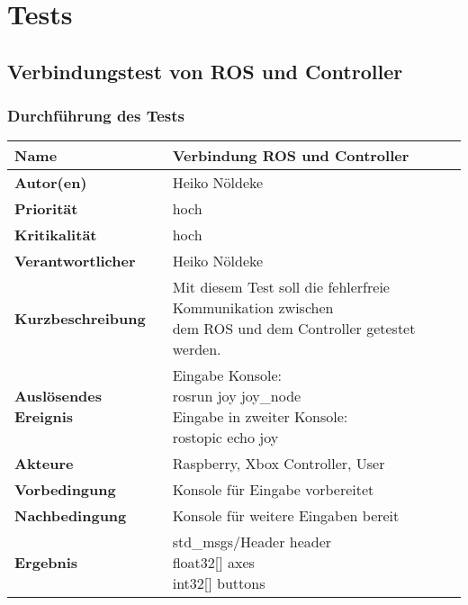 \section{Tests}
\label{sec:tests}

\subsection{Verbindungstest von ROS und Controller}
\subsubsection{Durchführung des Tests}
\begin{tabularx}{\columnwidth}{|p{4cm}|X|}
	\hline
	\textbf{Name} & Verbindung ROS und Controller\\
	\hline
	\textbf{Autor(en)} & Heiko Nöldeke \\
	\hline
	\textbf{Priorität} & hoch\\	
	\hline	
	\textbf{Kritikalität} & hoch\\
	\hline
	\textbf{Verantwortlicher} & Heiko Nöldeke\\
	\hline
	\textbf{Kurzbeschreibung} & \makecell[tl]{Mit diesem Test soll die fehlerfreie Kommunikation zwischen\\dem ROS und dem Controller getestet werden.} \\
	\hline
	\textbf{Auslösendes Ereignis} &  \makecell[tl]{Eingabe Konsole:\\rosrun joy joy\_node\\Eingabe in zweiter Konsole:\\rostopic echo joy}\\
	\hline
	\textbf{Akteure} & Raspberry, Xbox Controller, User\\
	\hline
	\textbf{Vorbedingung} & Konsole für Eingabe vorbereitet\\
	\hline
	\textbf{Nachbedingung} & Konsole für weitere Eingaben bereit\\
	\hline
	\textbf{Ergebnis} & \makecell[tl]{std\_msgs/Header header\\float32[] axes\\int32[] buttons}\\
	\hline
\end{tabularx}
\label{tab:TestCaseROSController}
\vspace{0.2cm}
